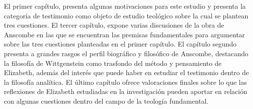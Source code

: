 El primer capítulo, presenta algunas motivaciones para este estudio y presenta la categoría de testimonio como objeto de estudio teológico sobre la cual se plantean tres cuestiones. El tercer capítulo, expone varias discusiones de la obra de Anscombe en las que se encuentran las premisas fundamentales para argumentar sobre las tres cuestiones planteadas en el primer capítulo. El capítulo segundo presenta a grandes rasgos el perfil biográfico y filosófico de Anscombe, destacando la filosofía de Wittgenstein como trasfondo del método y pensamiento de Elizabeth, además del interés que puede haber en estudiar el testimonio dentro de la filosofía analítica. El último capítulo ofrece valoraciones finales sobre lo que las reflexiones de Elizabeth estudiadas en la investigación pueden aportar en relación con algunas cuestiones dentro del campo de la teología fundamental.

